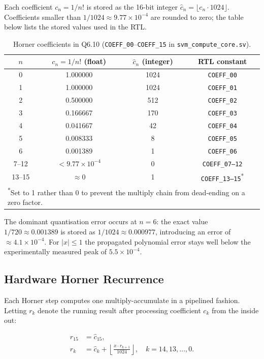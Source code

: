 \documentclass[11pt,a4paper]{article}
\begin{document}
Each coefficient $c_n = 1/n!$ is stored as the 16-bit integer
$\hat{c}_n = \lfloor c_n \cdot 1024 \rfloor$.  Coefficients smaller than
$1/1024 \approx 9.77\times10^{-4}$ are rounded to zero; the table below lists
the stored values used in the RTL.

\begin{table}[h]
\centering
\caption{Horner coefficients in Q6.10 (\texttt{COEFF\_00}--\texttt{COEFF\_15} in \texttt{svm\_compute\_core.sv}).}
\label{tab:coeffs}
\begin{tabular}{cccc}
\toprule
$n$ & $c_n = 1/n!$ (float) & $\hat{c}_n$ (integer) & RTL constant \\
\midrule
0  & 1.000000 & 1024 & \texttt{COEFF\_00} \\
1  & 1.000000 & 1024 & \texttt{COEFF\_01} \\
2  & 0.500000 & 512  & \texttt{COEFF\_02} \\
3  & 0.166667 & 170  & \texttt{COEFF\_03} \\
4  & 0.041667 & 42   & \texttt{COEFF\_04} \\
5  & 0.008333 & 8    & \texttt{COEFF\_05} \\
6  & 0.001389 & 1    & \texttt{COEFF\_06} \\
7--12 & $< 9.77\times10^{-4}$ & 0 & \texttt{COEFF\_07--12} \\
13--15 & $\approx 0$ & 1 & \texttt{COEFF\_13--15}\textsuperscript{*} \\
\bottomrule
\multicolumn{4}{l}{\footnotesize \textsuperscript{*}Set to 1 rather than 0 to prevent the multiply chain from dead-ending on a zero factor.}
\end{tabular}
\end{table}

The dominant quantisation error occurs at $n=6$: the exact value $1/720 \approx
0.001389$ is stored as $1/1024 \approx 0.000977$, introducing an error of
$\approx 4.1\times10^{-4}$.  For $|x| \leq 1$ the propagated polynomial error
stays well below the experimentally measured peak of $5.5\times10^{-4}$.

\subsection{Hardware Horner Recurrence}

Each Horner step computes one multiply-accumulate in a pipelined fashion.
Letting $r_k$ denote the running result after processing coefficient $c_k$
from the inside out:

\begin{align}
  r_{15} &= \hat{c}_{15}, \label{eq:rec_init}\\
  r_k    &= \hat{c}_k + \left\lfloor \frac{x \cdot r_{k+1}}{1024} \right\rfloor,
           \quad k = 14, 13, \ldots, 0. \label{eq:rec}
\end{align}
\end{document}
